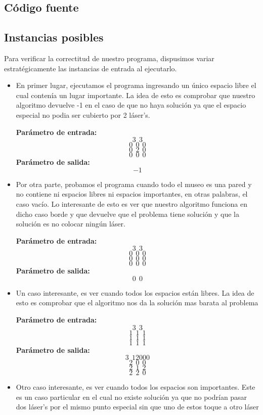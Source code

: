 \subsection{Código fuente}

\subsection{Instancias posibles}
Para verificar la correctitud de nuestro programa, dispusimos variar estratégicamente las instancias de entrada al ejecutarlo.
\begin{itemize}
\item En primer lugar, ejecutamos el programa ingresando un único espacio libre el cual contenía un lugar importante. La idea de esto es comprobar que nuestro algoritmo devuelve -1 en el caso de que no haya solución ya que el espacio especial no podia ser cubierto por 2 láser's.\newline

\textbf{Parámetro de entrada:} 
$$3\ \ 3$$
$$0\ \ 0\ \ 0$$
$$0\ \ 2\ \ 0$$
$$0\ \ 0\ \ 0$$
\textbf{Parámetro de salida:} $$-1$$\newline
\item Por otra parte, probamos el programa cuando todo el museo es una pared y no contiene ni espacios libres ni espacios importantes, en otras palabras, el caso vacío. Lo interesante de esto es ver que nuestro algoritmo funciona en dicho caso borde y que devuelve que el problema tiene solución y que la solución es no colocar ningún láser.\newline

\textbf{Parámetro de entrada:} 
$$3\ \ 3$$
$$0\ \ 0\ \ 0$$
$$0\ \ 0\ \ 0$$
$$0\ \ 0\ \ 0$$
\textbf{Parámetro de salida:} $$0\ \ 0$$\newline
\item Un caso interesante, es ver cuando todos los espacios están libres. La idea de esto es comprobar que el algoritmo nos da la solución mas barata al problema\newline

\textbf{Parámetro de entrada:} 
$$3\ \ 3$$
$$1\ \ 1\ \ 1$$
$$1\ \ 1\ \ 1$$
$$1\ \ 1\ \ 1$$
\textbf{Parámetro de salida:} 
$$3\ \ 12000$$
$$2\ \ 0\ \ 0$$
$$2\ \ 1\ \ 2$$
$$2\ \ 2\ \ 0$$
\newline

\item Otro caso interesante, es ver cuando todos los espacios son importantes. Este es un caso particular en el cual no existe solución ya que no podrían pasar dos láser's por el mismo punto especial sin que uno de estos toque a otro láser\newline


\end{itemize}
